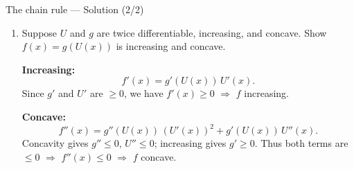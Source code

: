 \documentclass[9pt]{beamer}
\begin{document}
\begin{frame}{The chain rule — Solution (2/2)}

\small
\begin{enumerate}[leftmargin=0.55cm, label=\arabic*., start=3, rightmargin=0.2cm]

\item Suppose $U$ and $g$ are twice differentiable, increasing, and concave.  
Show $f(x)=g(U(x))$ is increasing and concave.

\textbf{Increasing:}
\[
f'(x)=g'(U(x))\,U'(x).
\]
Since $g'$ and $U'$ are $\ge 0$, we have $f'(x)\ge 0$ $\Rightarrow$ $f$ increasing.

\textbf{Concave:}
\[
f''(x)=g''(U(x))\,(U'(x))^2 + g'(U(x))\,U''(x).
\]
Concavity gives $g''\le 0$, $U''\le 0$; increasing gives $g'\ge 0$.  
Thus both terms are $\le 0$ $\Rightarrow$ $f''(x)\le 0$ $\Rightarrow$ $f$ concave.

\end{enumerate}

\end{frame}



    



    


\end{document}
